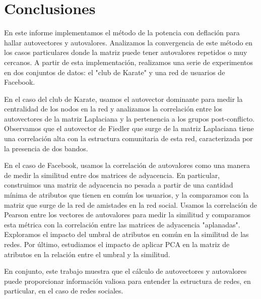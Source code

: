 \documentclass{article}
\begin{document}
\section{Conclusiones} \label{sec:conclusiones}

En este informe implementamos el método de la potencia con deflación para hallar autovectores y autovalores. Analizamos la convergencia de este método en los casos particulares donde la matriz puede tener autovalores repetidos o muy cercanos. A partir de esta implementación, realizamos una serie de experimentos en dos conjuntos de datos: el "club de Karate" y una red de usuarios de Facebook.

En el caso del club de Karate, usamos el autovector dominante para medir la centralidad de los nodos en la red y analizamos la correlación entre los autovectores de la matriz Laplaciana y la pertenencia a los grupos post-conflicto. Observamos que el autovector de Fiedler que surge de la matriz Laplaciana tiene una correlación alta con la estructura comunitaria de esta red, caracterizada por la presencia de dos bandos.

En el caso de Facebook, usamos la correlación de autovalores como una manera de medir la similitud entre dos matrices de adyacencia. En particular, construimos una matriz de adyacencia no pesada a partir de una cantidad mínima de atributos que tienen en común los usuarios, y la comparamos con la matriz que surge de la red de amistades en la red social. Usamos la correlación de Pearson entre los vectores de autovalores para medir la similitud y comparamos esta métrica con la correlación entre las matrices de adyacencia "aplanadas". Exploramos el impacto del umbral de atributos en común en la similitud de las redes. Por último, estudiamos el impacto de aplicar PCA en la matriz de atributos en la relación entre el umbral y la similitud.

En conjunto, este trabajo muestra que el cálculo de autovectores y autovalores puede proporcionar información valiosa para entender la estructura de redes, en particular, en el caso de redes sociales.



\end{document}
